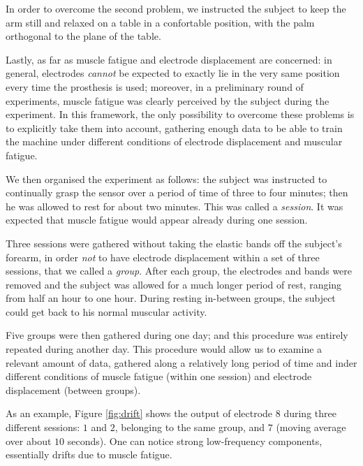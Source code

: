 In order to overcome the second problem, we instructed the subject to
keep the arm still and relaxed on a table in a confortable position,
with the palm orthogonal to the plane of the table.

Lastly, as far as muscle fatigue and electrode displacement are
concerned: in general, electrodes \emph{cannot} be expected to exactly
lie in the very same position every time the prosthesis is used;
moreover, in a preliminary round of experiments, muscle fatigue was
clearly perceived by the subject during the experiment. In this
framework, the only possibility to overcome these problems is to
explicitly take them into account, gathering enough data to be able to
train the machine under different conditions of electrode displacement
and muscular fatigue.

We then organised the experiment as follows: the subject was
instructed to continually grasp the sensor over a period of time of
three to four minutes; then he was allowed to rest for about two
minutes. This was called a \emph{session}. It was expected that muscle
fatigue would appear already during one session.

Three sessions were gathered without taking the elastic bands off the
subject's forearm, in order \emph{not} to have electrode displacement
within a set of three sessions, that we called a \emph{group}. After
each group, the electrodes and bands were removed and the subject was
allowed for a much longer period of rest, ranging from half an hour to
one hour. During resting in-between groups, the subject could get back
to his normal muscular activity.

Five groups were then gathered during one day; and this procedure was
entirely repeated during another day. This procedure would allow us to
examine a relevant amount of data, gathered along a relatively long
period of time and inder different conditions of muscle fatigue
(within one session) and electrode displacement (between groups).

As an example, Figure \ref{fig:drift} shows the output of electrode
$8$ during three different sessions: $1$ and $2$, belonging to the
same group, and $7$ (moving average over about $10$ seconds). One can
notice strong low-frequency components, essentially drifts due to
muscle fatigue.

